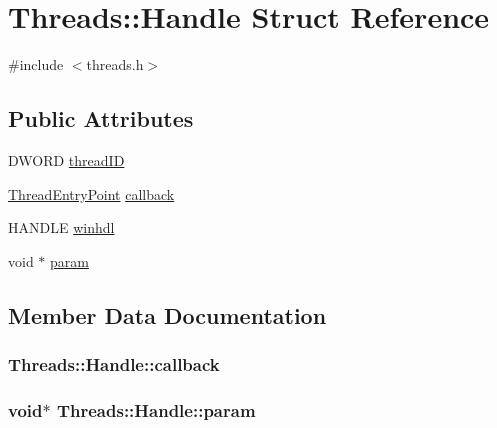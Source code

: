 \hypertarget{struct_threads_1_1_handle}{}\section{Threads\+:\+:Handle Struct Reference}
\label{struct_threads_1_1_handle}


{\ttfamily \#include $<$threads.\+h$>$}

\subsection*{Public Attributes}
\begin{DoxyCompactItemize}
\item 
D\+W\+O\+RD \hyperlink{struct_threads_1_1_handle_a5e2757013c0abb756250e817a4e69317}{thread\+ID}
\item 
\hyperlink{struct_threads_a96d14421067bf938cfee477e206b9022}{Thread\+Entry\+Point} \hyperlink{struct_threads_1_1_handle_a6ce8ea9aa439295782f770c96f41ff21}{callback}
\item 
H\+A\+N\+D\+LE \hyperlink{struct_threads_1_1_handle_ae96b38f14dd31c440d926bd664e3e950}{winhdl}
\item 
void $\ast$ \hyperlink{struct_threads_1_1_handle_a3fb6decb772694d8060c39573c3ea933}{param}
\end{DoxyCompactItemize}


\subsection{Member Data Documentation}
\subsubsection[{\texorpdfstring{callback}{callback}}]{ Threads\+::\+Handle\+::callback}\hypertarget{struct_threads_1_1_handle_a6ce8ea9aa439295782f770c96f41ff21}{}\label{struct_threads_1_1_handle_a6ce8ea9aa439295782f770c96f41ff21}
\subsubsection[{\texorpdfstring{param}{param}}]{\setlength{\rightskip}{0pt plus 5cm}void$\ast$ Threads\+::\+Handle\+::param}\hypertarget{struct_threads_1_1_handle_a3fb6decb772694d8060c39573c3ea933}{}\label{struct_threads_1_1_handle_a3fb6decb772694d8060c39573c3ea933}
